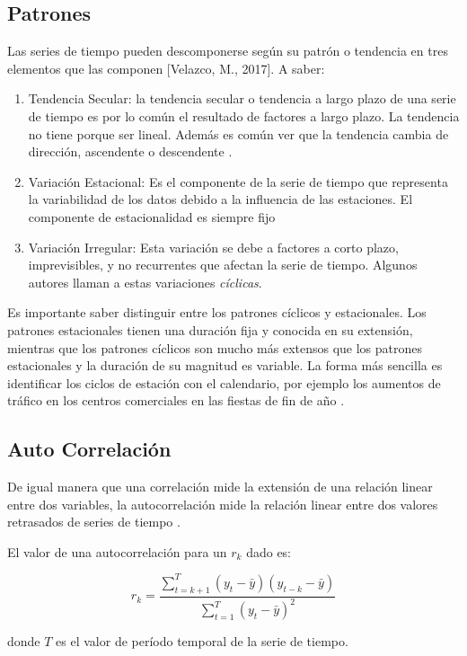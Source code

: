 \subsection*{Patrones}
Las series de tiempo pueden descomponerse según su patrón o tendencia en tres elementos que las componen [Velazco, M., 2017]. A saber:

\begin{enumerate}
	\item Tendencia Secular: la tendencia secular o tendencia a largo plazo de una serie de tiempo es por lo común el resultado de factores a largo plazo. La tendencia no tiene porque ser lineal. Además es común ver que la tendencia cambia de dirección, ascendente o descendente \cite{hyndman}.
	\item Variación Estacional: Es el componente de la serie de tiempo que representa la variabilidad de los datos debido a la influencia de las estaciones. El componente de estacionalidad es siempre fijo \cite{hyndman}
	\item Variación Irregular: Esta variación se debe a factores a corto plazo, imprevisibles, y no recurrentes que afectan la serie de tiempo. Algunos autores llaman a estas variaciones \emph{cíclicas}.
\end{enumerate}

Es importante saber distinguir entre los patrones cíclicos y estacionales. Los patrones estacionales tienen una duración fija y conocida en su extensión, mientras que los patrones cíclicos son mucho más extensos que los patrones estacionales y la duración de su magnitud es variable. La forma más sencilla es identificar los ciclos de estación con el calendario, por ejemplo los aumentos de tráfico en los centros comerciales en las fiestas de fin de año \cite{hyndman}.

\subsection*{Auto Correlación}
De igual manera que una correlación mide la extensión de una relación linear entre dos variables, la autocorrelación mide la relación linear entre dos valores retrasados de series de tiempo \cite{hyndman}.

El valor de una autocorrelación para un \(r_{k}\) dado es:

\[ r_{k} = \frac{\sum_{t = k + 1}^T(y_{t} - \bar{y})(y_{t - k} - \bar{y})}{\sum_{t = 1}^T(y_{t} - \bar{y})^{2}} \]

donde \(T\) es el valor de período temporal de la serie de tiempo.


